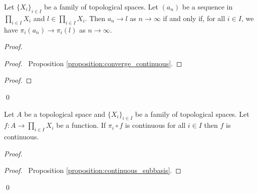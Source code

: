 \begin{proposition}
    \label{proposition:converge_product}
    Let $\{ X_i \}_{i \in I}$ be a family of topological spaces. Let $(a_n)$ be a sequence in $\prod_{i \in I} X_i$ and $l \in \prod_{i \in I} X_i$.
    Then $a_n \rightarrow l$ as $n \rightarrow \infty$ if and only if, for all $i \in I$, we have $\pi_i(a_n) \rightarrow \pi_i(l)$ as $n \rightarrow \infty$.
\end{proposition}

\begin{proof}
    \pf
    \begin{proof}
        \pf\ Proposition \ref{proposition:converge_continuous}.
    \end{proof}
    \begin{proof}
    \end{proof}
    \qed
\end{proof}

\begin{theorem}
    \label{theorem:product_continuous}
        Let $A$ be a topological space and $\{ X_i \}_{i \in I}$ be a family of topological spaces. Let $f : A \rightarrow \prod_{i \in I} X_i$ be a function.
        If $\pi_i \circ f$ is continuous for all $i \in I$ then $f$ is continuous.
\end{theorem}

\begin{proof}
    \pf
    \qedstep
    \begin{proof}
        \pf\ Proposition \ref{proposition:continuous_subbasis}.
    \end{proof}
    \qed
\end{proof}

